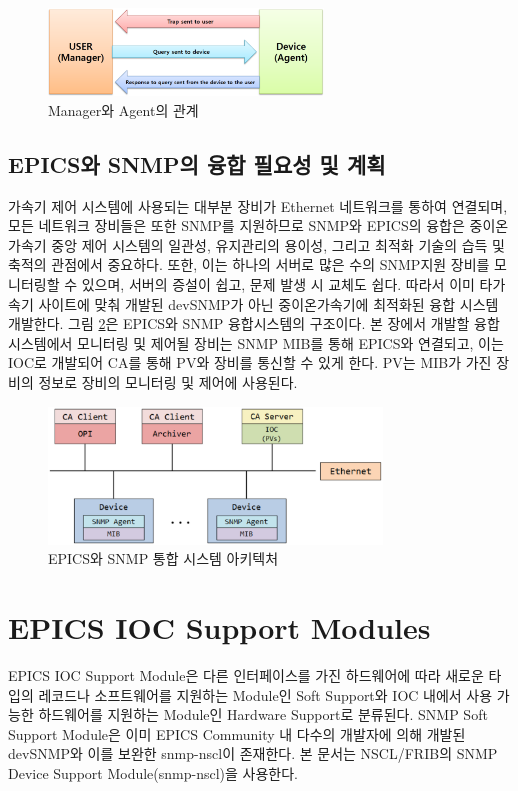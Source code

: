 \documentclass[11pt
  , a4paper
  , article
  , oneside
]{memoir}
\begin{document}
\begin{figure}[h!]
  \centering
  \includegraphics[width=0.65\textwidth]{./images/relationship_m_a.eps}
  \caption{Manager와 Agent의 관계}
  \label{fig:relationship_m_a}   
\end{figure}

\section{EPICS와 SNMP의 융합 필요성 및 계획}
가속기 제어 시스템에 사용되는 대부분 장비가 Ethernet 네트워크를 통하여 연결되며, 모든 네트워크 장비들은 또한 SNMP를 지원하므로 SNMP와 EPICS의 융합은 중이온가속기 중앙 제어 시스템의 일관성, 유지관리의 용이성, 그리고 최적화 기술의 습득 및 축적의 관점에서 중요하다. 또한, 이는 하나의 서버로 많은 수의 SNMP지원 장비를 모니터링할 수 있으며, 서버의 증설이 쉽고, 문제 발생 시 교체도 쉽다. 따라서 이미 타가속기 사이트에 맞춰 개발된 devSNMP가 아닌 중이온가속기에 최적화된 융합 시스템 개발한다. 그림 \ref{fig:architecture}은 EPICS와 SNMP 융합시스템의 구조이다. 본 장에서 개발할 융합 시스템에서 모니터링 및 제어될 장비는 SNMP MIB를 통해 EPICS와 연결되고, 이는 IOC로 개발되어 CA를 통해 PV와 장비를 통신할 수 있게 한다. PV는 MIB가 가진 장비의 정보로 장비의 모니터링 및 제어에 사용된다\citep{epicssnmp}. 

\begin{figure}[h!]
  \centering
  \includegraphics[width=0.79\textwidth]{./images/architecture.eps}
  \caption{EPICS와 SNMP 통합 시스템 아키텍처}
  \label{fig:architecture}   
\end{figure}

\chapter{EPICS IOC Support Modules}
EPICS IOC Support Module은 다른 인터페이스를 가진 하드웨어에 따라 새로운 타입의 레코드나 소프트웨어를 지원하는 Module인 Soft Support와 IOC 내에서 사용 가능한 하드웨어를 지원하는 Module인 Hardware Support로 분류된다. SNMP Soft Support Module은 이미 EPICS Community 내 다수의 개발자에 의해 개발된 devSNMP와 이를 보완한 snmp-nscl이 존재한다. 본 문서는 NSCL/FRIB의 SNMP Device Support Module(snmp-nscl)을 사용한다\citep{modules}.
\end{document}
